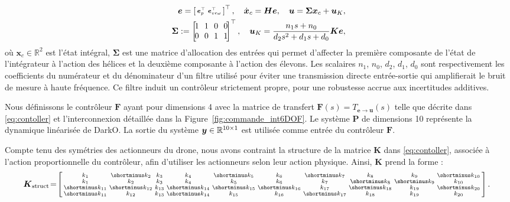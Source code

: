 \begin{subequations}
    \label{eq:contoller}
    \begin{align}
        \boldsymbol{e} = \smallmat{
        \boldsymbol{e}_{p}^\top & \boldsymbol{e}_{v\epsilon\omega}^\top}^\top, \quad \dot{\boldsymbol{x}}_{c} = \boldsymbol{H} \boldsymbol{e}, \quad    \boldsymbol{u} = \boldsymbol{\Sigma} \boldsymbol{x}_{c} + \boldsymbol{u}_{K},
        \\
        \boldsymbol{\Sigma} := \begin{bmatrix} \! 1 \!&\! 1\! & \!0\! &\! 0\!\\ \!0\! & \!0\! & \!1 \!& \!1\!\end{bmatrix}^\top, \quad
        \boldsymbol{u}_{K} = \frac{n_1 s+n_0}{d_2 s^{2}+d_1 s + d_0}\boldsymbol{K} \boldsymbol{e} ,
    \end{align}
\end{subequations}
où $\boldsymbol{x}_{c} \in \mathbb{R}^{2}$ est l'état intégral, $\boldsymbol{\Sigma}$ est une matrice d'allocation des entrées qui permet d'affecter la première composante de l'état de l'intégrateur à l'action des hélices et la deuxième composante à l'action des élevons. Les scalaires $n_1$, $n_0$,  $d_2$,  $d_1$,  $d_0$ sont respectivement les coefficients du numérateur et du dénominateur d'un filtre utilisé pour éviter une transmission directe entrée-sortie qui amplifierait le bruit de mesure à haute fréquence. Ce filtre induit un contrôleur strictement propre, pour une robustesse accrue aux incertitudes additives. 

Nous définissons le contrôleur $\boldsymbol{F}$ ayant pour dimensions 4 avec la matrice de transfert $\boldsymbol{F}(s) = T_{\boldsymbol{e} \rightarrow \boldsymbol{u}}(s)$ telle que décrite dans \eqref{eq:contoller} et l'interconnexion détaillée dans la Figure~\ref{fig:commande_int6DOF}. Le système $\boldsymbol{P}$ de dimensions 10 représente la dynamique linéarisée de DarkO. La sortie du système $\boldsymbol{y} \in {\mathbb R}^{10\times1}$ est utilisée comme entrée du contrôleur $\boldsymbol{F}$.

Compte tenu des symétries des actionneurs du drone, nous avons contraint la structure de la matrice $\boldsymbol{K}$ dans \eqref{eq:contoller}, associée à l'action proportionnelle du contrôleur, afin d'utiliser les actionneurs selon leur action physique. Ainsi, $\boldsymbol{K}$ prend la forme : 
\begin{align}
\label{eq:k_struct}
    \!\!\!\boldsymbol{K}_{\text{struct}} \!=\!  \smallmat{
             k_{1}& \shortminus k_{2}& k_{3}&  k_{4}& \shortminus k_{5}&  k_{6}& \shortminus k_{7}&  k_{8}&  k_{9}& \shortminus k_{10}\\
             k_{1}&  k_{2}& k_{3}&  k_{4}&  k_{5}&  k_{6}&   k_{7}& \shortminus k_{8}& \shortminus k_{9}&  k_{10}\\
            \shortminus k_{11}& \shortminus k_{12}& k_{13}& \shortminus k_{14}& \shortminus k_{15}& \shortminus k_{16}&   k_{17}& \shortminus k_{18}&  k_{19}& \shortminus k_{20}\\
            \shortminus k_{11}&  k_{12}& k_{13}& \shortminus k_{14}&  k_{15}&  k_{16}&   \shortminus k_{17}&  k_{18}&  k_{19}&  k_{20} 
         }.
\end{align}

